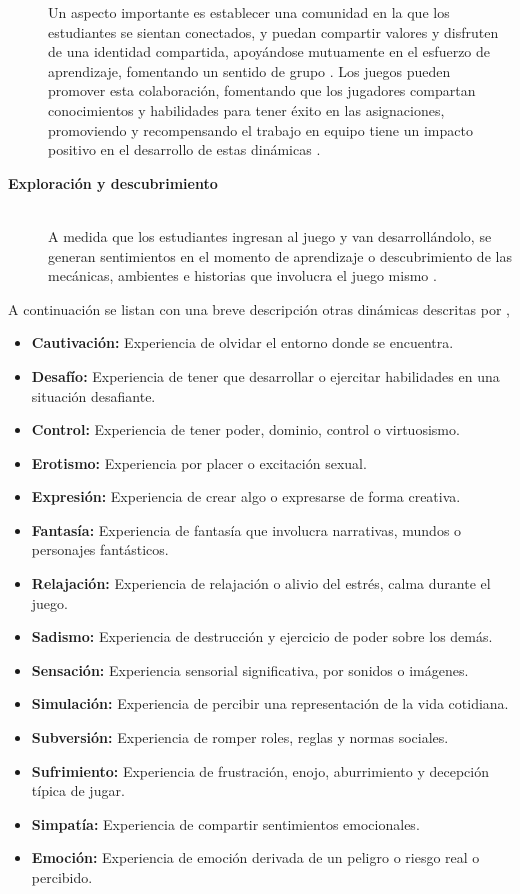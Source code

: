 \begin{description}
Un aspecto importante es establecer una comunidad en la que los estudiantes se sientan conectados, y puedan
compartir valores y disfruten de una identidad compartida, apoyándose mutuamente en el esfuerzo de
aprendizaje, fomentando un sentido de grupo \cite{DING20191}. Los juegos pueden promover esta colaboración,
fomentando que los jugadores compartan conocimientos y habilidades para tener éxito en las asignaciones,
promoviendo y recompensando el trabajo en equipo tiene un impacto positivo en el desarrollo de estas dinámicas
\cite{8190501}.
\item[\textbf{Exploración y descubrimiento}] \hfill \\ A medida que los estudiantes ingresan al juego y van
desarrollándolo, se generan sentimientos en el momento de aprendizaje o descubrimiento de las mecánicas,
ambientes e historias que involucra el juego mismo \cite{doi:10.1089/cyber.2012.0492}.
\end{description}

A continuación se listan con una breve descripción otras dinámicas descritas por ,

\begin{itemize}
\item \textbf{Cautivación:} Experiencia de olvidar el entorno donde se encuentra.
\item \textbf{Desafío:} Experiencia de tener que desarrollar o ejercitar habilidades en una situación
desafiante.
\item \textbf{Control:} Experiencia de tener poder, dominio, control o virtuosismo.
\item \textbf{Erotismo:} Experiencia por placer o excitación sexual.
\item \textbf{Expresión:} Experiencia de crear algo o expresarse de forma creativa.
\item \textbf{Fantasía:} Experiencia de fantasía que involucra narrativas, mundos o personajes fantásticos.
\item \textbf{Relajación:} Experiencia de relajación o alivio del estrés, calma durante el juego.
\item \textbf{Sadismo:} Experiencia de destrucción y ejercicio de poder sobre los demás.
\item \textbf{Sensación:} Experiencia sensorial significativa, por sonidos o imágenes.
\item \textbf{Simulación:} Experiencia de percibir una representación de la vida cotidiana.
\item \textbf{Subversión:} Experiencia de romper roles, reglas y normas sociales.
\item \textbf{Sufrimiento:} Experiencia de frustración, enojo, aburrimiento y decepción típica de jugar.
\item \textbf{Simpatía:} Experiencia de compartir sentimientos emocionales.
\item \textbf{Emoción:} Experiencia de emoción derivada de un peligro o riesgo real o percibido.
\end{itemize}

